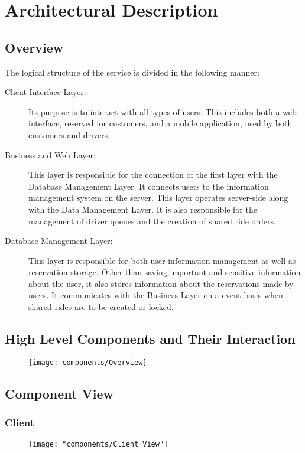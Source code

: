 \section{Architectural Description}

\subsection{Overview}
	The logical structure of the service is divided in the following manner:
	\begin{description}
		\item[Client Interface Layer:] Its purpose is to interact with all types of users. This includes both a web interface, reserved for customers, and a mobile application,
			used by both customers and drivers.
		\item[Business and Web Layer:] This layer is responsible for the connection of the first layer with the Database Management Layer. It connects users to the information management
			system on the server. This layer operates server-side along with the Data Management Layer. It is also responsible for the management of driver queues and
			the creation of shared ride orders.
		\item[Database Management Layer:] This layer is responsible for both user information management as well as reservation storage. Other than saving important and sensitive
			information about the user, it also stores information about the reservations made by users. It communicates with the Business Layer on a event basis when shared rides
			are to be created or locked.
	\end{description}
\subsection{High Level Components and Their Interaction}

	\begin{figure}[h!]
		\centering
		\texttt{[image: components/Overview]}
	\end{figure}

\subsection{Component View}
	\subsubsection{Client}
		\begin{figure}[h!]
			\centering
			\texttt{[image: "components/Client View"]}
		\end{figure}
